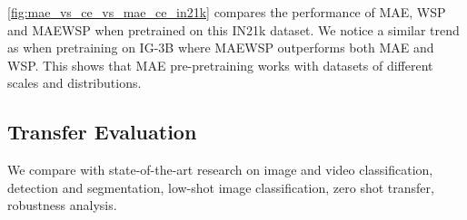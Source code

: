 \documentclass[10pt,twocolumn,letterpaper]{article}
\newcommand{\prept}{pre-pretraining\xspace}
\newcommand{\mae}{MAE\xspace}
\newcommand{\ce}{WSP\xspace}
\newcommand{\ours}{MAEWSP\xspace}  \newcommand{\oursig}{\ours{}\textsubscript{IG}\xspace}
\newcommand{\igSizeShort}{IG-3B\xspace}
\newcommand{\inetFullShort}{IN21k\xspace}
\newcommand{\sota}{state-of-the-art\xspace}
\begin{document}
\cref{fig:mae_vs_ce_vs_mae_ce_in21k} compares the performance of \mae, \ce and \ours when pretrained on this \inetFullShort
dataset.
We notice a similar trend as when pretraining on \igSizeShort where \ours outperforms both \mae and \ce.
This shows that \mae \prept works with datasets of different scales and distributions.












 \subsection{Transfer Evaluation}
\label{sec:results}

We compare with \sota research on image and video classification, detection and segmentation, low-shot image classification, zero shot 
transfer, robustness analysis.
\end{document}

